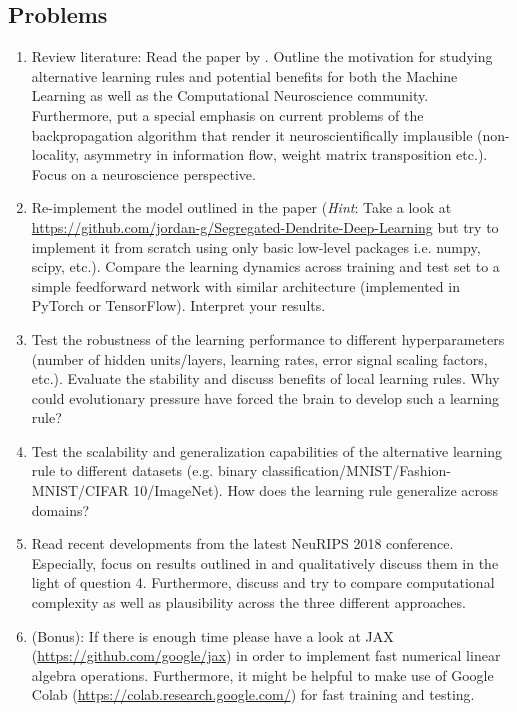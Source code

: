 \documentclass[12pt]{article}
\begin{document}
\subsection*{Problems}
\begin{enumerate}
	\item Review literature: Read the paper by \citet{guerguiev2017}. Outline the motivation for studying alternative learning rules and potential benefits for both the Machine Learning as well as the Computational Neuroscience community. Furthermore, put a special emphasis on current problems of the backpropagation algorithm that render it neuroscientifically implausible (non-locality, asymmetry in information flow, weight matrix transposition etc.). Focus on a neuroscience perspective.
	\item Re-implement the model outlined in the paper (\textit{Hint}: Take a look at \url{https://github.com/jordan-g/Segregated-Dendrite-Deep-Learning} but try to implement it from scratch using only basic low-level packages i.e. numpy, scipy, etc.). Compare the learning dynamics across training and test set to a simple feedforward network with similar architecture (implemented in PyTorch or TensorFlow). Interpret your results.
	\item Test the robustness of the learning performance to different hyperparameters (number of hidden units/layers, learning rates, error signal scaling factors, etc.). Evaluate the stability and discuss benefits of local learning rules. Why could evolutionary pressure have forced the brain to develop such a learning rule? 
	\item Test the scalability and generalization capabilities of the alternative learning rule to different datasets (e.g. binary classification/MNIST/Fashion-MNIST/CIFAR 10/ImageNet). How does the learning rule generalize across domains? 
	\item Read recent developments from the latest NeuRIPS 2018 conference. Especially, focus on results outlined in \citet{bartunov2018} and qualitatively discuss them in the light of question 4. Furthermore, discuss \citet{sacramento2018} and try to compare computational complexity as well as plausibility across the three different approaches.
	\item (Bonus): If there is enough time please have a look at JAX (\url{https://github.com/google/jax}) in order to implement fast numerical linear algebra operations. Furthermore, it might be helpful to make use of Google Colab (\url{https://colab.research.google.com/}) for fast training and testing.
\end{enumerate}




\end{document}
